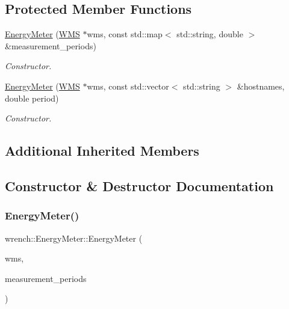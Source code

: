 \subsection*{Protected Member Functions}
\begin{DoxyCompactItemize}
\item 
\hyperlink{classwrench_1_1_energy_meter_a8533895c6eb032027069d3cd04b9f8f1}{Energy\+Meter} (\hyperlink{classwrench_1_1_w_m_s}{W\+MS} $\ast$wms, const std\+::map$<$ std\+::string, double $>$ \&measurement\+\_\+periods)
\begin{DoxyCompactList}\small\item\em Constructor. \end{DoxyCompactList}\item 
\hyperlink{classwrench_1_1_energy_meter_a31196bca18a3db3804c4bafd32770c64}{Energy\+Meter} (\hyperlink{classwrench_1_1_w_m_s}{W\+MS} $\ast$wms, const std\+::vector$<$ std\+::string $>$ \&hostnames, double period)
\begin{DoxyCompactList}\small\item\em Constructor. \end{DoxyCompactList}\end{DoxyCompactItemize}
\subsection*{Additional Inherited Members}


\subsection{Constructor \& Destructor Documentation}
\mbox{\label{classwrench_1_1_energy_meter_a8533895c6eb032027069d3cd04b9f8f1}} 
\subsubsection{\texorpdfstring{Energy\+Meter()}{EnergyMeter()}\hspace{0.1cm}{\footnotesize\ttfamily [1/2]}}
{\footnotesize\ttfamily wrench\+::\+Energy\+Meter\+::\+Energy\+Meter (\begin{DoxyParamCaption}\item[{\hyperlink{classwrench_1_1_w_m_s}{W\+MS} $\ast$}]{wms,  }\item[{const std\+::map$<$ std\+::string, double $>$ \&}]{measurement\+\_\+periods }\end{DoxyParamCaption})\hspace{0.3cm}{\ttfamily [protected]}}



